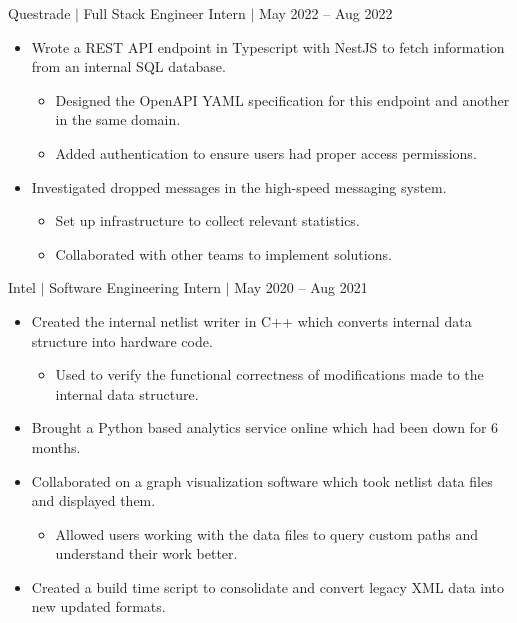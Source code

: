 \documentclass[12pt]{article}
\newcommand{\textDate}[3]{\noindent#1 $|$ #2 $|$ {\color{textGray} #3}}
\begin{document}
    \textDate{Questrade}{Full Stack Engineer Intern}{May 2022 -- Aug 2022}
    \begin{small}
        \begin{itemize}
            \itemsep0em 
            \item {Wrote a REST API endpoint in Typescript with NestJS to fetch information from an internal SQL database.}
                \begin{itemize}[label=$\circ$,topsep=-5px,partopsep=0px]
                    \itemsep0em 
                    \item {Designed the OpenAPI YAML specification for this endpoint and another in the same domain.}
                    \item {Added authentication to ensure users had proper access permissions.}
                \end{itemize}
            \item {Investigated dropped messages in the high-speed messaging system.}
                \begin{itemize}[label=$\circ$,topsep=-5px,partopsep=0px]
                    \itemsep0em 
                    \item {Set up infrastructure to collect relevant statistics.}
                    \item {Collaborated with other teams to implement solutions.}
                \end{itemize}
        \end{itemize}
    \end{small}

    \textDate{Intel}{Software Engineering Intern}{May 2020 -- Aug 2021}
    \begin{small}
        \begin{itemize}
            \itemsep0em 
            \item {Created the internal netlist writer in C++ which converts internal data structure into hardware code.}
                \begin{itemize}[label=$\circ$,topsep=-5px,partopsep=0px]
                    \itemsep0em 
                    \item {Used to verify the functional correctness of modifications made to the internal data structure.}
                \end{itemize}
            \item {Brought a Python based analytics service online which had been down for 6 months.}
            \item {Collaborated on a graph visualization software which took netlist data files and displayed them.}
                \begin{itemize}[label=$\circ$,topsep=-5px,partopsep=0px]
                    \itemsep0em 
                    \item {Allowed users working with the data files to query custom paths and understand their work better.}
                \end{itemize}
            \item {Created a build time script to consolidate and convert legacy XML data into new updated formats.}
        \end{itemize}
    \end{small}
\end{document}
